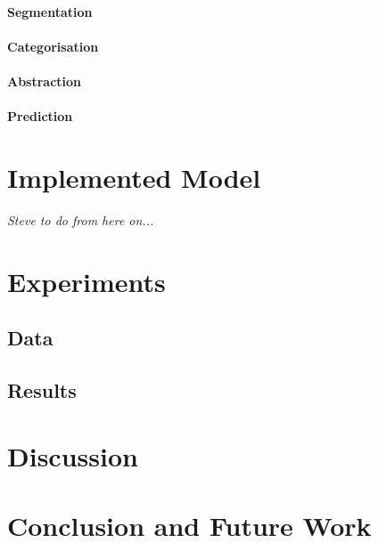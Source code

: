 \documentclass[runningheads]{llncs}
\begin{document}
\paragraph{Segmentation}
\paragraph{Categorisation}
\paragraph{Abstraction}
\paragraph{Prediction}

\section{Implemented Model}
{\it Steve to do from here on...}
\section{Experiments}
\subsection{Data}
\subsection{Results}
\section{Discussion}
\section{Conclusion and Future Work}

%
%



%
\end{document}
